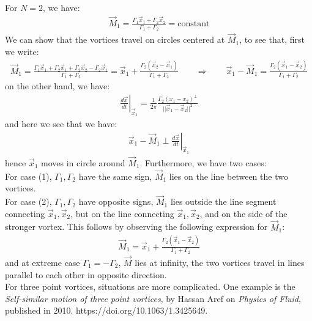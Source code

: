 \documentclass[11pt]{book}
\theoremstyle{break}
\theoremstyle{break}
\begin{document}
For $N=2$, we have:
\begin{align*}
\vec{M}_1 = \frac{\Gamma_1 \vec{x}_1 + \Gamma_2 \vec{x}_2}{\Gamma_1 + \Gamma_2} = \text{constant}
\end{align*}
We can show that the vortices travel on circles centered at $\vec{M}_1$, to see that, first we write:
\begin{align*}
\vec{M}_1 = \frac{\Gamma_1 \vec{x}_1 + \Gamma_2 \vec{x}_1 + \Gamma_2 \vec{x}_2 - \Gamma_2 \vec{x}_1}{\Gamma_1 + \Gamma_2} = \vec{x}_1 + \frac{\Gamma_2 ( \vec{x}_2 - \vec{x}_1)}{\Gamma_1 + \Gamma_2}\qquad \Rightarrow \qquad \vec{x}_1 -\vec{ M}_1 = \frac{\Gamma_2(\vec{x}_1 - \vec{x}_2)}{\Gamma_1 + \Gamma_2}
\end{align*}
on the other hand, we have:
\begin{align*}
\left.\frac{d\vec{x}}{dt}\right|_{\vec{x}_1} = \frac{1}{2\pi}\frac{ \Gamma_2 (x_1 - x_2)^{\perp}}{||\vec{x}_1 - \vec{x}_2||^2}
\end{align*}
and here we see that we have:
\begin{align*}
\vec{x}_1 - \vec{M}_1 \perp \left.\frac{d\vec{x}}{dt}\right|_{\vec{x}_1}
\end{align*}
hence $\vec{x}_1$ moves in circle around $\vec{M}_1$. Furthermore, we have two cases:\\
For case (1), $\Gamma_1, \Gamma_2$ have the same sign, $\vec{M}_1$ lies on the line between the two vortices.\\
For case (2), $\Gamma_1, \Gamma_2$ have opposite signs, $\vec{M}_1 $ lies outside the line segment connecting $\vec{x}_1,\vec{x}_2$, but on the line connecting $\vec{x}_1, \vec{x}_2$, and on the side of the stronger vortex. This follows by observing the following expression for $\vec{M}_1$:
\begin{align*}
\vec{M}_1 = \vec{x}_1 + \frac{\Gamma_2 ( \vec{x}_1 - \vec{x}_2)}{\Gamma_1 + \Gamma_2}
\end{align*}
and at extreme case $\Gamma_1 = -\Gamma_2$, $\vec{M}$ lies at infinity, the two vortices travel in lines parallel to each other in opposite direction. \\

For three point vortices, situations are more complicated. One example is the \textit{Self-similar motion of three point vortices}, by Hassan Aref on \textit{Physics of Fluid}, published in 2010. https://doi.org/10.1063/1.3425649.\\
\end{document}

